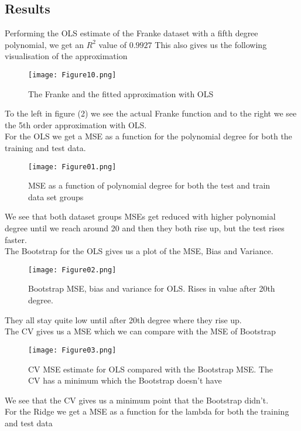 \documentclass[11pt, A4paper, english]{article}
\begin{document}
\begin{multicols}{2}
		\section{Results}
Performing the OLS estimate of the Franke dataset with a fifth degree polynomial, we get an $R^2$ value of $0.9927$ This also gives us the following visualisation of the approximation
			\begin{figure}[H]
\texttt{[image: Figure10.png]}
\caption{The Franke and the fitted approximation with OLS}
			\end{figure}
To the left in figure (2) we see the actual Franke function and to the right we see the 5th order approximation with OLS. \\
For the OLS we get a MSE as a function for the polynomial degree for both the training and test data.
			\begin{figure}[H]
\texttt{[image: Figure01.png]}
\caption{MSE as a function of polynomial degree for both the test and train data set groups}
			\end{figure}
We see that both dataset groups MSEs get reduced with higher polynomial degree until we reach around 20 and then they both rise up, but the test rises faster. \\
The Bootstrap for the OLS gives us a plot of the MSE, Bias and Variance.
			\begin{figure}[H]
\texttt{[image: Figure02.png]}
\caption{Bootstrap MSE, bias and variance for OLS. Rises in value after 20th degree.}
			\end{figure}
They all stay quite low until after 20th degree where they rise up. \\
The CV gives us a MSE which we can compare with the MSE of Bootstrap
			\begin{figure}[H]
\texttt{[image: Figure03.png]}
\caption{CV MSE estimate for OLS compared with the Bootstrap MSE. The CV has a minimum which the Bootstrap doesn't have}
			\end{figure}
We see that the CV gives us a minimum point that the Bootstrap didn't. \\
For the Ridge we get a MSE as a function for the lambda for both the training and test data
			\begin{figure}[H]

\end{figure}
\end{multicols}
\end{document}
